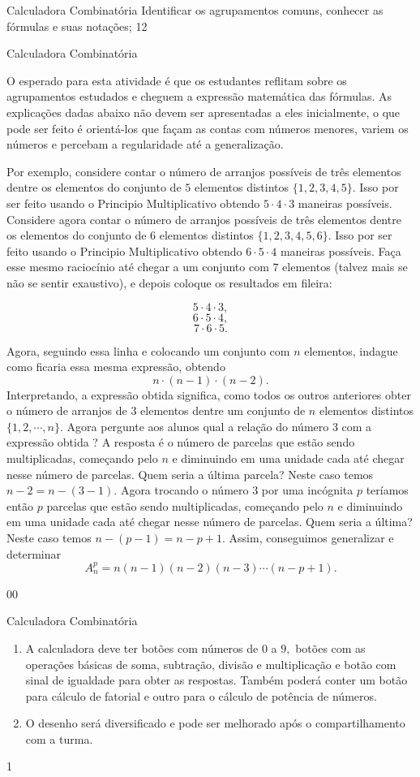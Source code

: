 \begin{objectives}{Calculadora Combinatória}
{
Identificar os agrupamentos comuns, conhecer as fórmulas e suas notações;
}{1}{2}
\end{objectives}
\begin{sugestions}{Calculadora Combinatória}
{
O esperado para esta atividade é que os estudantes reflitam sobre os agrupamentos estudados e cheguem a expressão matemática das fórmulas. As explicações dadas abaixo não devem ser apresentadas a eles inicialmente, o que pode ser feito é orientá-los que façam as contas com números menores, variem os números e percebam a regularidade até a generalização.

Por exemplo, considere contar o número de  arranjos possíveis de três elementos dentre os elementos do conjunto de $5$ elementos distintos $\{1,2,3,4,5\}.$ Isso por ser feito usando o Principio Multiplicativo obtendo $5 \cdot 4 \cdot 3$ maneiras possíveis. Considere agora contar o número de arranjos possíveis de três elementos dentre os elementos do conjunto de $6$ elementos distintos $\{1,2,3,4,5,6\}.$ Isso por ser feito usando o Principio Multiplicativo obtendo $6 \cdot 5 \cdot 4 $ maneiras possíveis. Faça esse mesmo raciocínio até chegar a um conjunto com $7$ elementos (talvez mais se não se sentir exaustivo), e depois coloque os resultados em fileira: 

$$5 \cdot 4 \cdot 3,$$
$$6 \cdot 5 \cdot 4,$$
 $$7 \cdot 6 \cdot 5.$$

Agora, seguindo essa linha e colocando um conjunto com $n$ elementos, indague como ficaria essa mesma expressão, obtendo $$n \cdot (n-1) \cdot (n-2).$$   Interpretando, a expressão obtida significa, como todos os outros anteriores obter o número de arranjos de 3 elementos dentre um conjunto de $n$ elementos distintos $\{1,2, \cdots, n\}.$ Agora pergunte aos alunos qual a relação do número $3$ com a expressão obtida ? A resposta é o número de parcelas que estão sendo multiplicadas, começando pelo $n$ e diminuindo em uma unidade cada até chegar nesse número de parcelas. Quem seria a última parcela? Neste caso temos $n-2=n-(3-1).$ Agora trocando o número $3$ por uma incógnita $p$ teríamos então $p$ parcelas que estão sendo multiplicadas, começando pelo $n$ e diminuindo em uma unidade cada até chegar nesse número de parcelas. Quem seria a última? Neste caso temos $n-(p-1)=n-p+1.$ Assim, conseguimos generalizar e determinar $$A_n^p=n (n-1)(n-2)(n-3) \cdots (n-p+1).$$
}{0}{0}
\end{sugestions}
\begin{answer}{Calculadora Combinatória}
{
\begin{enumerate}
\item A calculadora deve ter botões com números de $0$ a $9,$ botões com as operações básicas de soma, subtração, divisão e multiplicação e botão com sinal de igualdade para obter as respostas. Também poderá conter um botão para cálculo de fatorial e outro para  o cálculo de potência de números. 
\setcounter{enumi}{2}
\item O desenho será diversificado e pode ser melhorado após o compartilhamento com a turma.
\end{enumerate}
}{1}
\end{answer}
